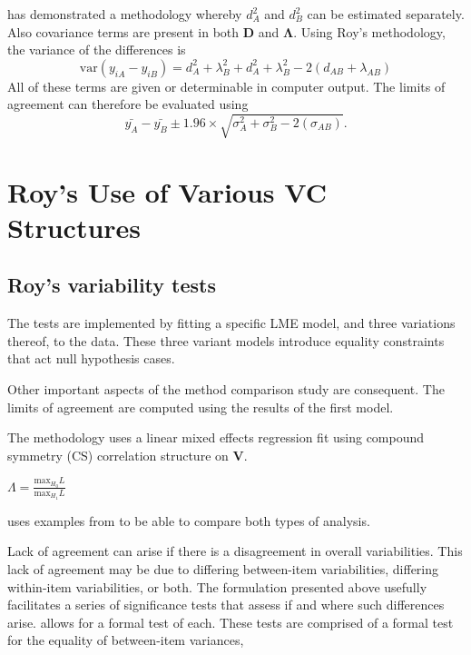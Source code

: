 \documentclass[12pt, a4paper]{article}
\theoremstyle{plain}
\theoremstyle{definition}
\theoremstyle{remark}
\begin{document}
	
	\citet{ARoy2009} has demonstrated a methodology whereby $d^2_{A}$ and $d^2_{B}$ can be estimated separately. Also covariance terms are present in both $\boldsymbol{D}$ and $\boldsymbol{\Lambda}$. Using Roy's methodology, the variance of the differences is
	\begin{equation}
	\mbox{var} (y_{iA}-y_{iB})= d^2_{A} + \lambda^2_{B} + d^2_{A} + \lambda^2_{B} - 2(d_{AB} + \lambda_{AB})
	\end{equation}
	All of these terms are given or determinable in computer output.
	The limits of agreement can therefore be evaluated using
	\begin{equation}
	\bar{y_{A}}-\bar{y_{B}} \pm 1.96 \times \sqrt{ \sigma^2_{A} + \sigma^2_{B}  - 2(\sigma_{AB})}.
	\end{equation}
	

	
	
	\newpage
	\section{Roy's Use of Various VC Structures}
\subsection{Roy's variability tests}
The tests are implemented by fitting a specific LME model, and three variations thereof, to the data. These three variant models introduce equality constraints that act null hypothesis cases.

Other important aspects of the method comparison study are consequent. The limits of agreement are computed using the results of the first model.

The methodology uses a linear mixed effects regression fit using
compound symmetry (CS) correlation structure on \textbf{V}.


$\Lambda = \frac{\mbox{max}_{H_{0}}L}{\mbox{max}_{H_{1}}L}$



\citet{ARoy2009} uses examples from \citet{BA86} to be able to
compare both types of analysis.


\newpage		
	Lack of agreement can arise if there is a disagreement in overall variabilities. This lack of agreement may be due to differing between-item variabilities, differing within-item variabilities, or both. The formulation presented above usefully facilitates a series of significance tests that assess if and where such differences arise. \citet{ARoy2009} allows for a formal test of each. These tests are comprised of a formal test for the equality of between-item variances,
	
\end{document}
